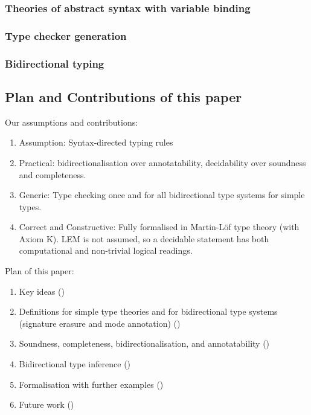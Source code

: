 \cite{Cimini2020,Cimini2022}

\citep{Ahrens2018,Fiore2022,Gheri2020,Ahrens2022}
\cite{Allais2021}

\subsubsection{Theories of abstract syntax with variable binding}
\cite{Fiore1999,Hirschowitz2010,Ahrens2018,Fiore2022,Ahrens2021,Arkor2020,Hirschowitz2022}
\cite{Fiore2013,Hamana2011,Hamana2022}


\subsubsection{Type checker generation}
\cite{Gast2004,Grewe2015,Pacak2020,Cimini2020}

\subsubsection{Bidirectional typing}

\cite{Pierce2000}
\cite{Dunfield2021}
\cite{Jones2007}


\subsection{Plan and Contributions of this paper}

Our assumptions and contributions:
\begin{enumerate}
  \item Assumption: Syntax-directed typing rules
  \item Practical: bidirectionalisation over annotatability, decidability over soundness and completeness.
  \item Generic: Type checking once and for all bidirectional type systems for simple types.
  \item Correct and Constructive: Fully formalised in Martin-Löf type theory (with Axiom K).
    LEM is not assumed, so a decidable statement has both computational and non-trivial logical readings.
\end{enumerate}

Plan of this paper:
\begin{enumerate}
  \item Key ideas ()
  \item Definitions for simple type theories and for bidirectional type systems (signature erasure and mode annotation) ()
  \item Soundness, completeness, bidirectionalisation, and annotatability ()
  \item Bidirectional type inference ()
  \item Formalisation with further examples ()
  \item Future work ()
\end{enumerate}



